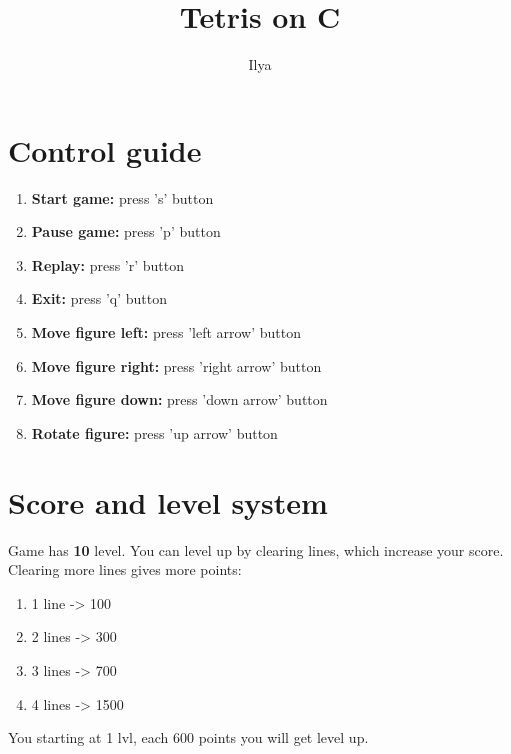 \documentclass{article}
\begin{document}
\title{Tetris on C}
\date{}
\author{Ilya}
\maketitle

\section{Control guide}

\begin{enumerate}
  \item \textbf{Start game:} press 's' button
  \item \textbf{Pause game:} press 'p' button
  \item \textbf{Replay:} press 'r' button
  \item \textbf{Exit:} press 'q' button
  \item \textbf{Move figure left:} press 'left arrow' button
  \item \textbf{Move figure right:} press 'right arrow' button
  \item \textbf{Move figure down:} press 'down arrow' button
  \item \textbf{Rotate figure:} press 'up arrow' button
\end{enumerate}

\section{Score and level system}
Game has \textbf{10} level. You can level up by clearing lines, which increase your score. Clearing more lines gives more points:
\begin{enumerate}
  \item 1 line -> 100
  \item 2 lines -> 300
  \item 3 lines -> 700
  \item 4 lines -> 1500
\end{enumerate}

You starting at 1 lvl, each 600 points you will get level up.
\end{document}
